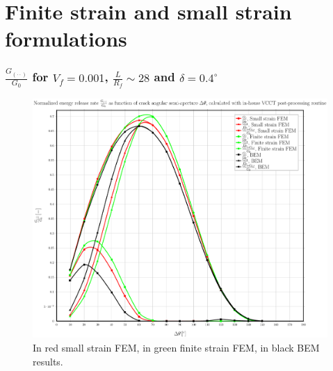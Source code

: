 \documentclass[first,firstsupp,lastsupp,handout,last,hyperref,table]{ETHclass}
\begin{document}
\section[FS \& SS]{Finite strain and small strain formulations}

\begin{frame}
\frametitle{\small $\frac{G_{\left(\cdot\cdot\right)}}{G_{0}}$ for $V_{f}=0.001$, $\frac{L}{R_{f}}\sim28$ and $\delta=0.4^{\circ}$}
\vspace{-0.5cm}
\centering
\captionsetup[figure]{font=scriptsize,labelfont=scriptsize}
\begin{figure}[!h]
\centering
\includegraphics[height=0.7\textheight]{2017-06-23_AbqRunSummary_SingleFiberEqRfSmallFiniteStrain_M-VCCT_Summary.pdf}
  \caption{\scriptsize In red small strain FEM, in green finite strain FEM, in black BEM results.}
  \label{fig:res1}
\end{figure}
\end{frame}
\end{document}
